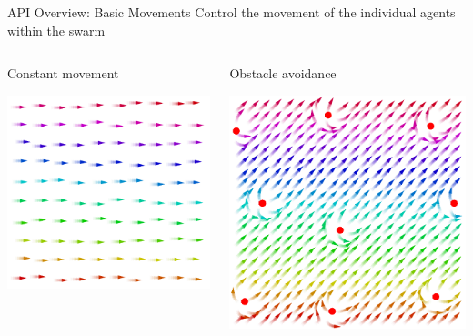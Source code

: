 \documentclass[presentation, 9pt]{beamer}\mode<presentation>{\usetheme{AMSBolognaFC}}
\begin{document}
\begin{frame}{API Overview: Basic Movements}
\centering
Control the movement of the individual agents within the swarm
\begin{columns}
	\begin{column}[t]{0.3\textwidth}
		\begin{exampleblock}{Constant movement}
		
		\includegraphics[width=\textwidth]{img/constant-movement.png}
		\end{exampleblock}
	\end{column}
	\begin{column}[t]{0.3\textwidth}
		\begin{exampleblock}{Obstacle avoidance}
			
		\includegraphics[width=\textwidth]{img/obstracle.png}
		

\end{exampleblock}
\end{column}
\end{columns}
\end{frame}
\end{document}
